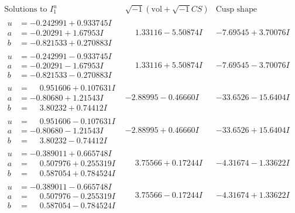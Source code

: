 \documentclass[1p]{elsarticle_modified}
\theoremstyle{definition}
\newcommand{\I}{\sqrt{-1}}
\begin{document}
$$\begin{array}{c|c|c}  
\text{Solutions to }I^u_{1}& \I (\text{vol} + \sqrt{-1}CS) & \text{Cusp shape}\\
 \hline 
\begin{aligned}
u &= -0.242991 + 0.933745 I \\
a &= -0.20291 + 1.67953 I \\
b &= -0.821533 + 0.270883 I\end{aligned}
 & \phantom{-}1.33116 - 5.50874 I & -7.69545 + 3.70076 I \\ \hline\begin{aligned}
u &= -0.242991 - 0.933745 I \\
a &= -0.20291 - 1.67953 I \\
b &= -0.821533 - 0.270883 I\end{aligned}
 & \phantom{-}1.33116 + 5.50874 I & -7.69545 - 3.70076 I \\ \hline\begin{aligned}
u &= \phantom{-}0.951606 + 0.107631 I \\
a &= -0.80680 + 1.21543 I \\
b &= \phantom{-}3.80232 + 0.74412 I\end{aligned}
 & -2.88995 - 0.46660 I & -33.6526 - 15.6404 I \\ \hline\begin{aligned}
u &= \phantom{-}0.951606 - 0.107631 I \\
a &= -0.80680 - 1.21543 I \\
b &= \phantom{-}3.80232 - 0.74412 I\end{aligned}
 & -2.88995 + 0.46660 I & -33.6526 + 15.6404 I \\ \hline\begin{aligned}
u &= -0.389011 + 0.665748 I \\
a &= \phantom{-}0.507976 + 0.255319 I \\
b &= \phantom{-}0.587054 + 0.784524 I\end{aligned}
 & \phantom{-}3.75566 + 0.17244 I & -4.31674 - 1.33622 I \\ \hline\begin{aligned}
u &= -0.389011 - 0.665748 I \\
a &= \phantom{-}0.507976 - 0.255319 I \\
b &= \phantom{-}0.587054 - 0.784524 I\end{aligned}
 & \phantom{-}3.75566 - 0.17244 I & -4.31674 + 1.33622 I \\ \hline\begin{aligned}

\end{aligned}
\end{array}$$
\end{document}
